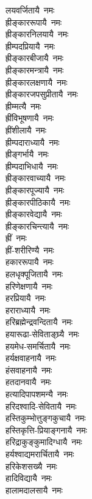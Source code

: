 \begin{multicols}{2}
\begin{flushleft}
लयवर्जितायै~नमः\hfill {}\\
ह्रीङ्काररूपायै~नमः\\
ह्रीङ्कारनिलयायै~नमः\\
ह्रीम्पदप्रियायै~नमः\\
ह्रीङ्कारबीजायै~नमः\\
ह्रीङ्कारमन्त्रायै~नमः\\
ह्रीङ्कारलक्षणायै~नमः\\
ह्रीङ्कारजपसुप्रीतायै~नमः\\
ह्रीम्मत्यै~नमः\\
ह्रींविभूषणायै~नमः\\
ह्रींशीलायै~नमः\hfill {}\\
ह्रीम्पदाराध्यायै~नमः\\
ह्रीङ्गर्भायै~नमः\\
ह्रीम्पदाभिधायै~नमः\\
ह्रीङ्कारवाच्यायै~नमः\\
ह्रीङ्कारपूज्यायै~नमः\\
ह्रीङ्कारपीठिकायै~नमः\\
ह्रीङ्कारवेद्यायै~नमः\\
ह्रीङ्कारचिन्त्यायै~नमः\\
ह्रीं~नमः\\
ह्रीं-शरीरिण्यै~नमः\hfill {}\\
हकाररूपायै~नमः\\
हलधृक्पूजितायै~नमः\\
हरिणेक्षणायै~नमः\\
हरप्रियायै~नमः\\
हराराध्यायै~नमः\\
हरिब्रह्मेन्द्रवन्दितायै~नमः\\
हयारूढा-सेविताङ्घ्र्यै~नमः\\
हयमेध-समर्चितायै~नमः\\
हर्यक्षवाहनायै~नमः\\
हंसवाहनायै~नमः\hfill {}\\
हतदानवायै~नमः\\
हत्यादिपापशमन्यै~नमः\\
हरिदश्वादि-सेवितायै~नमः\\
हस्तिकुम्भोत्तुङ्गकुचायै~नमः\\
हस्तिकृत्ति-प्रियाङ्गनायै~नमः\\
हरिद्राकुङ्कुमादिग्धायै~नमः\\
हर्यश्वाद्यमरार्चितायै~नमः\\
हरिकेशसख्यै~नमः\\
हादिविद्यायै~नमः\\
हालामदालसायै~नमः\hfill {}\\

\end{flushleft}
\end{multicols}
